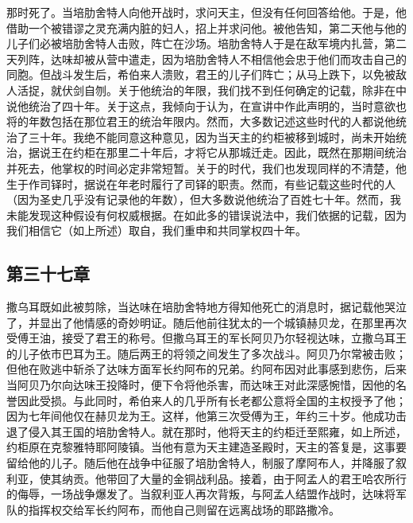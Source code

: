 那时死了。当培肋舍特人向他开战时，求问天主，但没有任何回答给他。于是，他借助一个被错谬之灵充满内脏的妇人，招上并求问他。被他告知，第二天他与他的儿子们必被培肋舍特人击败，阵亡在沙场。培肋舍特人于是在敌军境内扎营，第二天列阵，达味却被从营中遣走，因为培肋舍特人不相信他会忠于他们而攻击自己的同胞。但战斗发生后，希伯来人溃败，君王的儿子们阵亡；从马上跌下，以免被敌人活捉，就伏剑自刎。关于他统治的年限，我们找不到任何确定的记载，除非在中说他统治了四十年。关于这点，我倾向于认为，在宣讲中作此声明的，当时意欲也将的年数包括在那位君王的统治年限内。然而，大多数记述这些时代的人都说他统治了三十年。我绝不能同意这种意见，因为当天主的约柜被移到城时，尚未开始统治，据说王在约柜在那里二十年后，才将它从那城迁走。因此，既然在那期间统治并死去，他掌权的时间必定非常短暂。关于的时代，我们也发现同样的不清楚，他生于作司铎时，据说在年老时履行了司铎的职责。然而，有些记载这些时代的人（因为圣史几乎没有记录他的年数），但大多数说他统治了百姓七十年。然而，我未能发现这种假设有何权威根据。在如此多的错误说法中，我们依据的记载，因为我们相信它（如上所述）取自，我们重申和共同掌权四十年。\par


\subsection{第三十七章}

撒乌耳既如此被剪除，当达味在培肋舍特地方得知他死亡的消息时，据记载他哭泣了，并显出了他情感的奇妙明证。随后他前往犹太的一个城镇赫贝龙，在那里再次受傅王油，接受了君王的称号。但撒乌耳王的军长阿贝乃尔轻视达味，立撒乌耳王的儿子依市巴耳为王。随后两王的将领之间发生了多次战斗。阿贝乃尔常被击败；但他在败逃中斩杀了达味方面军长约阿布的兄弟。约阿布因对此事感到悲伤，后来当阿贝乃尔向达味王投降时，便下令将他杀害，而达味王对此深感惋惜，因他的名誉因此受损。与此同时，希伯来人的几乎所有长老都公意将全国的主权授予了他；因为七年间他仅在赫贝龙为王。这样，他第三次受傅为王，年约三十岁。他成功击退了侵入其王国的培肋舍特人。就在那时，他将天主的约柜迁至熙雍，如上所述，约柜原在克黎雅特耶阿陵镇。当他有意为天主建造圣殿时，天主的答复是，这事要留给他的儿子。随后他在战争中征服了培肋舍特人，制服了摩阿布人，并降服了叙利亚，使其纳贡。他带回了大量的金铜战利品。接着，由于阿孟人的君王哈农所行的侮辱，一场战争爆发了。当叙利亚人再次背叛，与阿孟人结盟作战时，达味将军队的指挥权交给军长约阿布，而他自己则留在远离战场的耶路撒冷。\par

